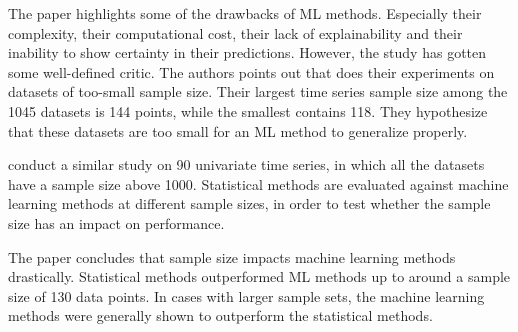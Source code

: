 The paper \cite{Makridakis2018} highlights some of the drawbacks of ML methods. Especially their complexity, their computational cost,
their lack of explainability and their inability to show certainty in their predictions.
However, the study has gotten some well-defined critic. The authors \citeauthor*{Cerqueira2019} points
out that \cite{Makridakis2018} does their experiments on datasets of too-small sample size.
Their largest time series sample size among the 1045 datasets is 144 points, while the smallest contains 118.
They hypothesize that these datasets are too small for an ML method to generalize properly.

\cite{Cerqueira2019} conduct a similar study on 90 univariate time series, in which
all the datasets have a sample size above 1000.
Statistical methods are evaluated against machine learning methods at different sample sizes,
in order to test whether the sample size has an impact on performance.

The paper \cite{Cerqueira2019} concludes that sample size impacts machine learning methods drastically.
Statistical methods outperformed ML methods up to around a sample size of 130 data points.
In cases with larger sample sets, the machine learning methods were generally shown to outperform the statistical methods.



